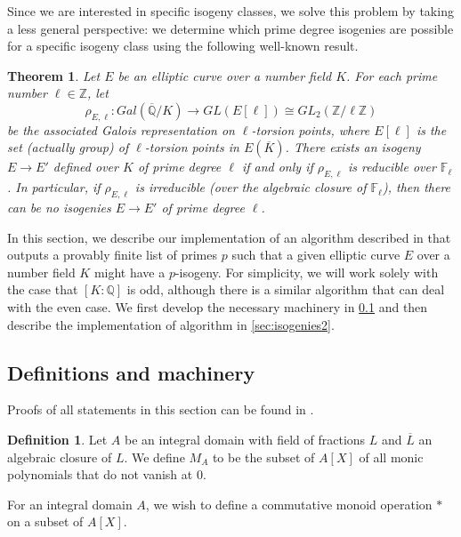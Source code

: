 \documentclass{amsart}
\newtheorem{theorem}{Theorem}[subsection]
\theoremstyle{definition}
\newtheorem*{definition}{Definition}
\newcommand{\Q}{\mathbb{Q}}
\newcommand{\Z}{\mathbb{Z}}
\begin{document}
Since we are interested in specific isogeny classes, we solve this problem by taking a less general perspective: we determine which prime degree isogenies are possible for a specific isogeny class using the following well-known result.

\begin{theorem} \label{Galois reps}
Let $E$ be an elliptic curve over a number field $K$. For each prime number $\ell \in \Z$, let
\begin{equation}
\rho_{E,\ell}: Gal(\overline{\Q}/K) \rightarrow GL(E[\ell]) \cong GL_2(\Z/\ell\Z)
\nonumber \end{equation}
be the associated Galois representation on $\ell$-torsion points, where $E[\ell]$ is the set (actually group) of $\ell$-torsion points in $E(\overline{K})$. There exists an isogeny $E \rightarrow E'$ defined over $K$ of prime degree $\ell$ if and only if $\rho_{E,\ell}$ is reducible over $\mathbb{F}_\ell$. In particular, if $\rho_{E,\ell}$ is irreducible (over the algebraic closure of $\mathbb{F}_\ell$), then there can be no isogenies $E \rightarrow E'$ of prime degree $\ell$.
\end{theorem}

In this section, we describe our implementation of an algorithm described in \cite{billerey:isogenies} that outputs a provably finite list of primes $p$ such that a given elliptic curve $E$ over a number field $K$ might have a $p$-isogeny. For simplicity, we will work solely with the case that $[K:\Q]$ is odd, although there is a similar algorithm that can deal with the even case. We first develop the necessary machinery in \ref{sec:isogenies1} and then describe the implementation of algorithm in \ref{sec:isogenies2}.

\subsection{Definitions and machinery} \label{sec:isogenies1}

Proofs of all statements in this section can be found in \cite{billerey:isogenies}.

\begin{definition}
Let $A$ be an integral domain with field of fractions $L$ and $\overline{L}$ an algebraic closure of $L$. We define $M_A$ to be the subset of $A[X]$ of all monic polynomials that do not vanish at $0$.
\end{definition}

For an integral domain $A$, we wish to define a commutative monoid operation $*$ on a subset of $A[X]$.
\end{document}
